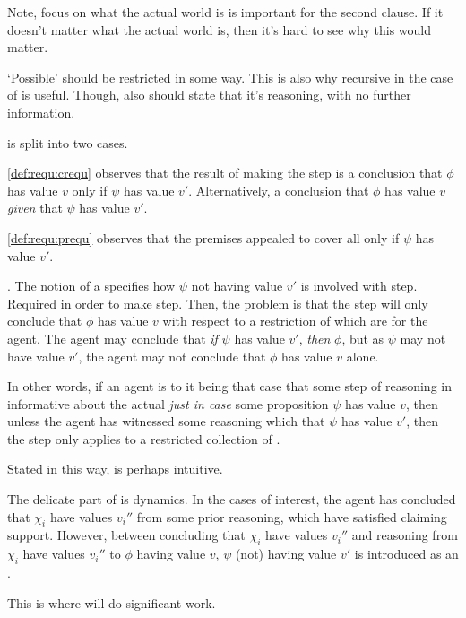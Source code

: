 \begin{note}
    \color{red}
    Note, focus on what the actual world is is important for the second clause.
    If it doesn't matter what the actual world is, then it's hard to see why this would matter.

    `Possible' should be restricted in some way.
    This is also why recursive in the case of \support{} is useful.
    Though, also should state that it's reasoning, with no further information.

    \requ{} is split into two cases.

    \ref{def:requ:crequ} observes that the result of making the step is a conclusion that \(\phi\) has value \(v\) only if \(\psi\) has value \(v'\).
    Alternatively, a conclusion that \(\phi\) has value \(v\) \emph{given} that \(\psi\) has value \(v'\).

    \ref{def:requ:prequ} observes that the premises appealed to cover all  only if \(\psi\) has value \(v'\).
\end{note}

\begin{note}
  \ideaCS{}.
  The notion of a \requ{} specifies how \(\psi\) not having value \(v'\) is involved with step.
  Required in order to make step.
  Then, the problem is that the step will only conclude that \(\phi\) has value \(v\) with respect to a restriction of  which are \epVAd{} for the agent.
  The agent may conclude that \emph{if} \(\psi\) has value \(v'\), \emph{then} \(\phi\), but as \(\psi\) may not have value \(v'\), the agent may not conclude that \(\phi\) has value \(v\) alone.

  In other words, if an agent is \committed{} to it being that case that some step of reasoning in informative about the actual \world{} \emph{just in case} some proposition \(\psi\) has value \(v\), then unless the agent has witnessed some reasoning which  that \(\psi\) has value \(v'\), then the step only applies to a restricted collection of .
\end{note}

\begin{note}[Dynamics]
  Stated in this way, \ideaCS{} is perhaps intuitive.

  The delicate part of \ideaCS{} is dynamics.
  In the cases of interest, the agent has concluded that \(\chi_{i}\) have values \(v_{i}''\) from some prior reasoning, which have satisfied claiming support.
  However, between concluding that \(\chi_{i}\) have values \(v_{i}''\) and reasoning from \(\chi_{i}\) have values \(v_{i}''\) to \(\phi\) having value \(v\), \(\psi\) (not) having value \(v'\) is introduced as an \epVN{}.

  This is where \ideaCS{} will do significant work.
\end{note}

